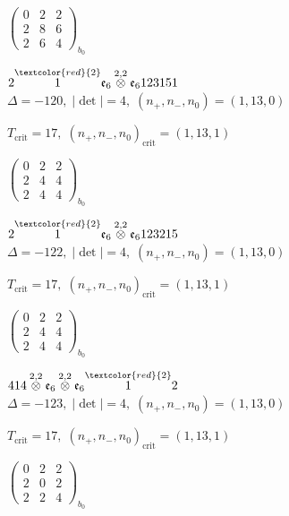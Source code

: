 \documentclass[10pt]{article}
\begin{document}
\hspace{2em}$\left(\begin{smallmatrix}0 & 2 & 2 \\ 2 & 8 & 6 \\ 2 & 6 & 4\end{smallmatrix}\right)_{\!b_0}$

\smallskip

$2\overset{\textcolor{red}{2}}{1}\mathfrak{e}_6\overset{2,2}{\otimes}\mathfrak{e}_6123151$ \quad $\Delta=-120,\; |\det|=4,\; (n_+,n_-,n_0)=(1,13,0)$

\hspace{1em}$T_{\text{crit}}=17,\; (n_+,n_-,n_0)_{\text{crit}}=(1,13,1)$

\hspace{2em}$\left(\begin{smallmatrix}0 & 2 & 2 \\ 2 & 4 & 4 \\ 2 & 4 & 4\end{smallmatrix}\right)_{\!b_0}$

\smallskip

$2\overset{\textcolor{red}{2}}{1}\mathfrak{e}_6\overset{2,2}{\otimes}\mathfrak{e}_6123215$ \quad $\Delta=-122,\; |\det|=4,\; (n_+,n_-,n_0)=(1,13,0)$

\hspace{1em}$T_{\text{crit}}=17,\; (n_+,n_-,n_0)_{\text{crit}}=(1,13,1)$

\hspace{2em}$\left(\begin{smallmatrix}0 & 2 & 2 \\ 2 & 4 & 4 \\ 2 & 4 & 4\end{smallmatrix}\right)_{\!b_0}$

\smallskip

$414\overset{2,2}{\otimes}\mathfrak{e}_6\overset{2,2}{\otimes}\mathfrak{e}_6\overset{\textcolor{red}{2}}{1}2$ \quad $\Delta=-123,\; |\det|=4,\; (n_+,n_-,n_0)=(1,13,0)$

\hspace{1em}$T_{\text{crit}}=17,\; (n_+,n_-,n_0)_{\text{crit}}=(1,13,1)$

\hspace{2em}$\left(\begin{smallmatrix}0 & 2 & 2 \\ 2 & 0 & 2 \\ 2 & 2 & 4\end{smallmatrix}\right)_{\!b_0}$
\end{document}
